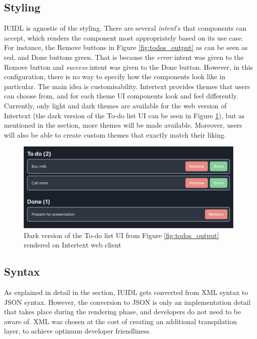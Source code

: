 \subsection{Styling}

IUIDL is agnostic of the styling. There are several \textit{intent}'s that components can accept, which renders the component most appropriately based on its use case. For instance, the Remove buttons in Figure \ref{fig:todos_output} as can be seen as red, and Done buttons green. That is because the \textit{error} intent was given to the Remove button and \textit{success} intent was given to the Done button. However, in this configuration, there is no way to specify how the components look like in particular. The main idea is customisability. Intertext provides themes that users can choose from, and for each theme UI components look and feel differently. Currently, only light and dark themes are available for the web version of Intertext (the dark version of the To-do list UI can be seen in Figure \ref{fig:todos_output_dark}), but as mentioned in the  section, more themes will be made available. Moreover, users will also be able to create custom themes that exactly match their liking.

\begin{figure}
  \centering
  \includegraphics[width=13cm]{thesis/paper/images/todos_dark.png}
  \caption{Dark version of the To-do list UI from Figure \ref{fig:todos_output} rendered on Intertext web client}%
  \label{fig:todos_output_dark}%
\end{figure}

\subsection{Syntax}

As explained in detail in the  section, IUIDL gets converted from XML syntax to JSON syntax. However, the conversion to JSON is only an implementation detail that takes place during the rendering phase, and developers do not need to be aware of. XML was chosen at the cost of creating an additional transpilation layer, to achieve optimum developer friendliness. 


